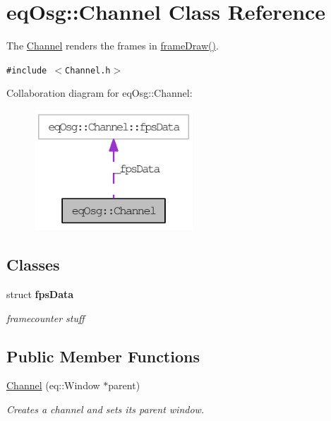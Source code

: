 \hypertarget{a00002}{
\section{eqOsg::Channel Class Reference}
\label{a00002}
}
The \hyperlink{a00002}{Channel} renders the frames in \hyperlink{a00002_70cfd22742da9b9aa3e3478f356ba220}{frameDraw()}.  


{\tt \#include $<$Channel.h$>$}

Collaboration diagram for eqOsg::Channel:\nopagebreak
\begin{figure}[H]
\begin{center}
\leavevmode
\includegraphics[width=168pt]{a00087}
\end{center}
\end{figure}
\subsection*{Classes}
\begin{CompactItemize}
\item 
struct \textbf{fpsData}
\begin{CompactList}\small\item\em framecounter stuff \item\end{CompactList}\end{CompactItemize}
\subsection*{Public Member Functions}
\begin{CompactItemize}
\item 
\hyperlink{a00002_332b524bf3dd36fb43ff699fb8b64052}{Channel} (eq::Window $\ast$parent)
\begin{CompactList}\small\item\em Creates a channel and sets its parent window. \item\end{CompactList}\end{CompactItemize}
